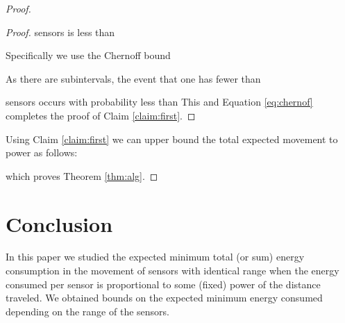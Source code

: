 \documentclass[final,5p,times,twocolumn]{elsarticle_mod}
\begin{document}
\begin{proof}
\begin{proof}
sensors is less than 
 
Specifically we use the Chernoff bound 



As there are  subintervals, the event that one has fewer than 

sensors occurs with probability less than  This and Equation \eqref{eq:chernof} completes the proof of Claim \ref{claim:first}. 
\end{proof}
Using Claim  \ref{claim:first} we can upper bound the total expected movement to power  as follows:

which proves Theorem \ref{thm:alg}. 
\end{proof}


\section{Conclusion}
\label{conclusion}
In this paper
we studied the expected minimum total (or sum) energy consumption in the movement of sensors with identical range when the energy consumed per sensor is proportional to some (fixed) power of the distance traveled. We obtained bounds on the expected minimum energy consumed 
depending on the range of the sensors. 

\end{document}

